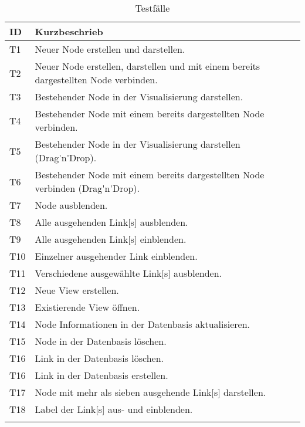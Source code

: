 \begin{longtable}{|p{1cm} | P{6cm} |}
  \hline
    ID & Kurzbeschrieb \\\hline
    T1 & Neuer \gls{Node} erstellen und darstellen.\\\hline
    T2 & Neuer \gls{Node} erstellen, darstellen und mit einem bereits dargestellten \gls{Node} verbinden.\\\hline
    T3 & Bestehender \gls{Node} in der Visualisierung darstellen.\\\hline
    T4 & Bestehender \gls{Node} mit einem bereits dargestellten \gls{Node} verbinden.\\\hline
    T5 & Bestehender \gls{Node} in der Visualisierung darstellen (\gls{Drag'n'Drop}).\\\hline
    T6 & Bestehender \gls{Node} mit einem bereits dargestellten \gls{Node} verbinden (\gls{Drag'n'Drop}).\\\hline
    T7 & \gls{Node} ausblenden.\\\hline
    T8 & Alle ausgehenden \gls{Link}[s] ausblenden.\\\hline
    T9 & Alle ausgehenden \gls{Link}[s] einblenden.\\\hline
    T10 & Einzelner ausgehender \gls{Link} einblenden.\\\hline
    T11 & Verschiedene ausgewählte \gls{Link}[s] ausblenden.\\\hline
    T12 & Neue \gls{View} erstellen.\\\hline
    T13 & Existierende \gls{View} öffnen.\\\hline
    T14 & \gls{Node} Informationen in der Datenbasis aktualisieren.\\\hline
    T15 & \gls{Node} in der Datenbasis löschen.\\\hline
    T16 & \gls{Link} in der Datenbasis löschen.\\\hline
    T16 & \gls{Link} in der Datenbasis erstellen.\\\hline
    T17 & \gls{Node} mit mehr als sieben ausgehende \gls{Link}[s] darstellen.\\\hline
    T18 & Label der \gls{Link}[s] aus- und einblenden. \\\hline
    \caption{Testfälle}
  \label{tab:testkonzept}
\end{longtable}


